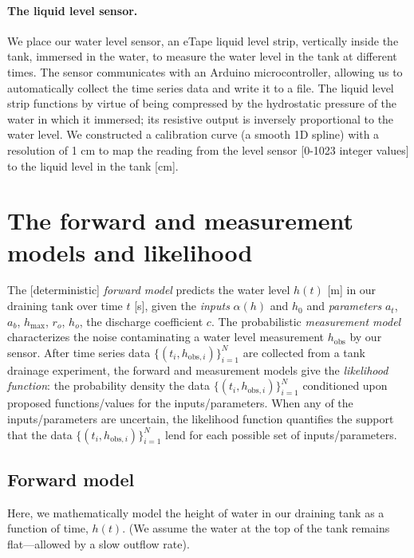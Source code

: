 \documentclass[openacc]{rsproca_new}%
\newcommand\thedata {$\{(t_i,h_{\text{obs}, i})\}_{i=1}^{N}$\xspace}
\begin{document}
\paragraph{The liquid level sensor.}
We place our water level sensor, an eTape\texttrademark\xspace liquid level strip, vertically inside the tank, immersed in the water, to measure the water level in the tank at different times. The sensor communicates with an Arduino microcontroller, allowing us to automatically collect the time series data and write it to a file. 
The liquid level strip functions by virtue of being compressed by the hydrostatic pressure of the water in which it immersed; its resistive output is inversely proportional to the water level. 
\cite{eTape}
We constructed a calibration curve (a smooth 1D spline) with a resolution of 1 cm to map the reading from the level sensor [0-1023 integer values] to the liquid level in the tank [cm]. 

\section{The forward and measurement models and likelihood} \label{sec:forward_model}
The [deterministic] \emph{forward model} predicts the water level $h(t)$ [m] in our draining tank over time $t$ [s], given the \emph{inputs} $\alpha(h)$ and $h_0$ and \emph{parameters} $a_t$, $a_b$, $h_{\text{max}}$, $r_o$, $h_o$, the discharge coefficient $c$. 
The probabilistic \emph{measurement model} characterizes the noise contaminating a water level measurement $h_{\text{obs}}$ by our sensor.
After time series data \thedata are collected from a tank drainage experiment, the forward and measurement models give the \emph{likelihood function}: the probability density the data \thedata conditioned upon proposed functions/values for the inputs/parameters. 
When any of the inputs/parameters are uncertain, the likelihood function quantifies the support that the data \thedata lend for each possible set of inputs/parameters.

\subsection{Forward model}
Here, we mathematically model the height of water in our draining tank as a function of time, $h(t)$. (We assume the water at the top of the tank remains flat---allowed by a slow outflow rate). 
\end{document}
